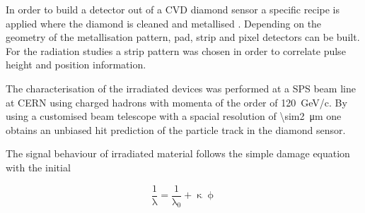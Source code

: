 In order to build a detector out of a \ac{CVD} diamond sensor a specific recipe is applied where the diamond is cleaned and metallised \cite{kagan}. Depending on the geometry of the metallisation pattern, pad, strip and pixel detectors can be built. For the radiation studies a strip pattern was chosen in order to correlate pulse height and position information.\par
The characterisation of the irradiated devices was performed at a \ac{SPS} beam line at CERN using charged hadrons with momenta of the order of \SI{120}{\giga\electronvolt/c}. By using a customised beam telescope with a spacial resolution of \SI{\sim2}{\micro\meter} one obtains an unbiased hit prediction of the particle track in the diamond sensor.\par
The signal behaviour of irradiated material follows the simple damage equation with the initial 

\begin{equation}
	\frac{1}{\uplambda} = \frac{1}{\uplambda_0} + \upkappa\upphi \label{erad}
\end{equation}

